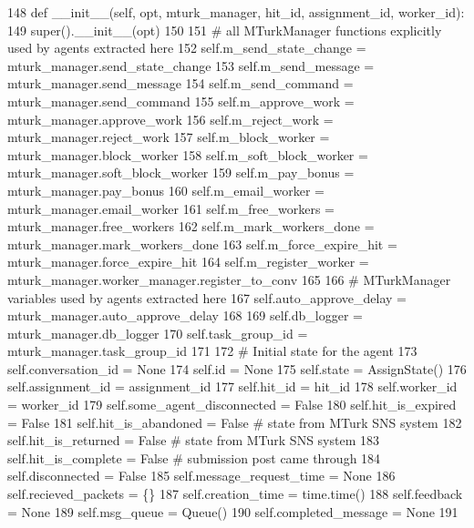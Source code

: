 \begin{DoxyCode}
148     \textcolor{keyword}{def }\_\_init\_\_(self, opt, mturk\_manager, hit\_id, assignment\_id, worker\_id):
149         super().\_\_init\_\_(opt)
150 
151         \textcolor{comment}{# all MTurkManager functions explicitly used by agents extracted here}
152         self.m\_send\_state\_change = mturk\_manager.send\_state\_change
153         self.m\_send\_message = mturk\_manager.send\_message
154         self.m\_send\_command = mturk\_manager.send\_command
155         self.m\_approve\_work = mturk\_manager.approve\_work
156         self.m\_reject\_work = mturk\_manager.reject\_work
157         self.m\_block\_worker = mturk\_manager.block\_worker
158         self.m\_soft\_block\_worker = mturk\_manager.soft\_block\_worker
159         self.m\_pay\_bonus = mturk\_manager.pay\_bonus
160         self.m\_email\_worker = mturk\_manager.email\_worker
161         self.m\_free\_workers = mturk\_manager.free\_workers
162         self.m\_mark\_workers\_done = mturk\_manager.mark\_workers\_done
163         self.m\_force\_expire\_hit = mturk\_manager.force\_expire\_hit
164         self.m\_register\_worker = mturk\_manager.worker\_manager.register\_to\_conv
165 
166         \textcolor{comment}{# MTurkManager variables used by agents extracted here}
167         self.auto\_approve\_delay = mturk\_manager.auto\_approve\_delay
168 
169         self.db\_logger = mturk\_manager.db\_logger
170         self.task\_group\_id = mturk\_manager.task\_group\_id
171 
172         \textcolor{comment}{# Initial state for the agent}
173         self.conversation\_id = \textcolor{keywordtype}{None}
174         self.id = \textcolor{keywordtype}{None}
175         self.state = AssignState()
176         self.assignment\_id = assignment\_id
177         self.hit\_id = hit\_id
178         self.worker\_id = worker\_id
179         self.some\_agent\_disconnected = \textcolor{keyword}{False}
180         self.hit\_is\_expired = \textcolor{keyword}{False}
181         self.hit\_is\_abandoned = \textcolor{keyword}{False}  \textcolor{comment}{# state from MTurk SNS system}
182         self.hit\_is\_returned = \textcolor{keyword}{False}  \textcolor{comment}{# state from MTurk SNS system}
183         self.hit\_is\_complete = \textcolor{keyword}{False}  \textcolor{comment}{# submission post came through}
184         self.disconnected = \textcolor{keyword}{False}
185         self.message\_request\_time = \textcolor{keywordtype}{None}
186         self.recieved\_packets = \{\}
187         self.creation\_time = time.time()
188         self.feedback = \textcolor{keywordtype}{None}
189         self.msg\_queue = Queue()
190         self.completed\_message = \textcolor{keywordtype}{None}
191 
\end{DoxyCode}


